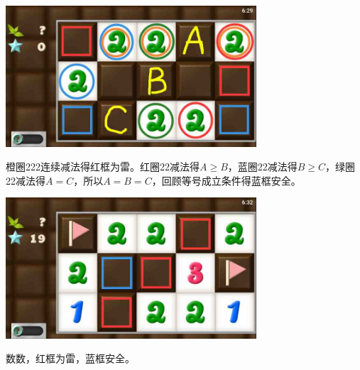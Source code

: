 \subsection{} %
\begin{center}
    \includegraphics[width=0.7\textwidth]{puzzlelow/107-1.jpg}
\end{center}
橙圈222连续减法得红框为雷。红圈22减法得$A\ge B$，蓝圈22减法得$B\ge C$，绿圈22减法得$A=C$，所以$A=B=C$，回顾等号成立条件得蓝框安全。
\begin{center}
    \includegraphics[width=0.7\textwidth]{puzzlelow/107-2.jpg}
\end{center}
数数，红框为雷，蓝框安全。

